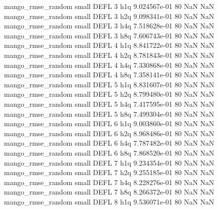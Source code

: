 mango_rmse_random      small     DEFL                 3                  h1q 9.024567e-01 80            NaN                NaN
mango_rmse_random      small     DEFL                 3                  h2q 9.098341e-01 80            NaN                NaN
mango_rmse_random      small     DEFL                 3                  h4q 7.518628e-01 80            NaN                NaN
mango_rmse_random      small     DEFL                 3                  h8q 7.606743e-01 80            NaN                NaN
mango_rmse_random      small     DEFL                 4                  h1q 8.841722e-01 80            NaN                NaN
mango_rmse_random      small     DEFL                 4                  h2q 8.781843e-01 80            NaN                NaN
mango_rmse_random      small     DEFL                 4                  h4q 7.330868e-01 80            NaN                NaN
mango_rmse_random      small     DEFL                 4                  h8q 7.358141e-01 80            NaN                NaN
mango_rmse_random      small     DEFL                 5                  h1q 8.831607e-01 80            NaN                NaN
mango_rmse_random      small     DEFL                 5                  h2q 8.799480e-01 80            NaN                NaN
mango_rmse_random      small     DEFL                 5                  h4q 7.417595e-01 80            NaN                NaN
mango_rmse_random      small     DEFL                 5                  h8q 7.499304e-01 80            NaN                NaN
mango_rmse_random      small     DEFL                 6                  h1q 9.003860e-01 80            NaN                NaN
mango_rmse_random      small     DEFL                 6                  h2q 8.968486e-01 80            NaN                NaN
mango_rmse_random      small     DEFL                 6                  h4q 7.787482e-01 80            NaN                NaN
mango_rmse_random      small     DEFL                 6                  h8q 7.868520e-01 80            NaN                NaN
mango_rmse_random      small     DEFL                 7                  h1q 9.234354e-01 80            NaN                NaN
mango_rmse_random      small     DEFL                 7                  h2q 9.255185e-01 80            NaN                NaN
mango_rmse_random      small     DEFL                 7                  h4q 8.228276e-01 80            NaN                NaN
mango_rmse_random      small     DEFL                 7                  h8q 8.266372e-01 80            NaN                NaN
mango_rmse_random      small     DEFL                 8                  h1q 9.536071e-01 80            NaN                NaN

